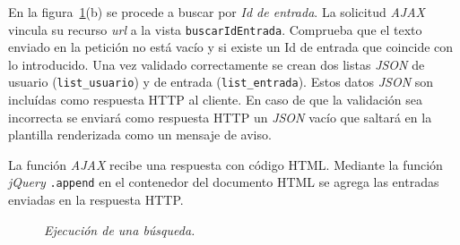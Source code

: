 \documentclass[a4paper, 12pt]{book}
\begin{document}
\begin{itemize}
  En la figura~\ref{fig:buscarajax}(b) se procede a buscar por \textit{Id de entrada}. La solicitud \textit{AJAX} vincula su recurso \textit{url} a la 
  vista \texttt{buscarIdEntrada}. Comprueba que el texto enviado en la petici\'on no est\'a vac\'io y si existe un Id de entrada que coincide con lo
  introducido. Una vez validado correctamente se crean dos listas \textit{JSON} de usuario (\texttt{list\_usuario}) y de entrada (\texttt{list\_entrada}). 
  Estos datos \textit{JSON} son inclu\'idas como respuesta HTTP al cliente. En caso de que la validaci\'on sea incorrecta se enviar\'a como respuesta HTTP 
  un \textit{JSON} vac\'io que saltar\'a en la plantilla renderizada como un mensaje de aviso.
  
  La funci\'on \textit{AJAX} recibe una respuesta con c\'odigo HTML. Mediante la funci\'on \textit{jQuery} \texttt{.append} en el contenedor del documento 
  HTML se agrega las entradas enviadas en la respuesta HTTP.
  
  \begin{figure}
    \centering
    \caption{\textit{Ejecuci\'on de una b\'usqueda.}}
    \label{fig:buscarajax}
  \end{figure}
  
\end{itemize}
\end{document}
